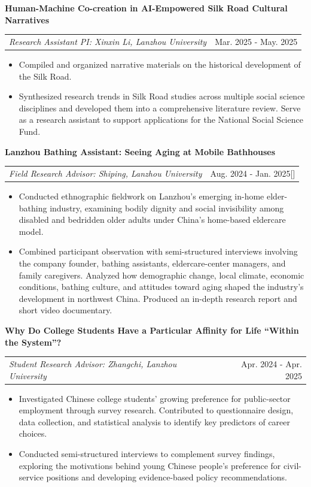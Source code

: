 \documentclass[a4paper,11pt]{article}
\makeatletter
\renewcommand{\normalsize}{\fontsize{10.5bp}{13.5bp}\selectfont}
\renewcommand{\small}{\normalsize}
\renewcommand{\footnotesize}{\normalsize}
\newcommand{\resumeExperience}[4]{
\item
    \textbf{#1}\\[1.65bp]
    \begin{tabularx}{0.98\textwidth}[t]{@{}X r@{}}
        \small\textit{#3} & \footnotesize #4\hspace{1mm}#2
    \end{tabularx}
    \vspace{-1mm}
}
\newcommand{\resumeItemListStart}{\begin{itemize}[leftmargin=3.6mm,labelsep=1mm,topsep=0pt,partopsep=0pt,before=\vspace{4.65bp},itemsep=0.5mm]\justifying}
\newcommand{\resumeItemListEnd}{\end{itemize}}
\makeatother
\begin{document}
\resumeExperience
  {Human-Machine Co-creation in AI-Empowered Silk Road Cultural Narratives}
  {}
  {Research Assistant \textbar{} PI: Xinxin Li, Lanzhou University}{Mar. 2025 - May. 2025}
\resumeItemListStart
\item Compiled and organized narrative materials on the historical development of the Silk Road.
\item Synthesized research trends in Silk Road studies across multiple social science disciplines and developed them into a comprehensive literature review. Serve as a research assistant to support applications for the National Social Science Fund.
\resumeItemListEnd

\resumeExperience
  {Lanzhou Bathing Assistant: Seeing Aging at Mobile Bathhouses}{{}[\href{https://mp.weixin.qq.com/s/s2g08dymkUmCNVC3X7gi9g}{\textcolor{darkblue}{\faGlobe}}]}
  {Field Research \textbar{} Advisor: Shiping, Lanzhou University}{Aug. 2024 - Jan. 2025}
\resumeItemListStart
  \item Conducted ethnographic fieldwork on Lanzhou's emerging in-home elder-bathing industry, examining bodily dignity and social invisibility among disabled and bedridden older adults under China's home-based eldercare model.
  \item Combined participant observation with semi-structured interviews involving the company founder, bathing assistants, eldercare-center managers, and family caregivers. Analyzed how demographic change, local climate, economic conditions, bathing culture, and attitudes toward aging shaped the industry’s development in northwest China. Produced an in-depth research report and short video documentary.
\resumeItemListEnd

\resumeExperience
  {Why Do College Students Have a Particular Affinity for Life ``Within the System''?}
  {}
  {Student Research \textbar{} Advisor: Zhangchi, Lanzhou University}{Apr. 2024 - Apr. 2025}
\resumeItemListStart
  \item Investigated Chinese college students' growing preference for public-sector employment through survey research. Contributed to questionnaire design, data collection, and statistical analysis to identify key predictors of career choices.
  \item Conducted semi-structured interviews to complement survey findings, exploring the motivations behind young Chinese people's preference for civil-service positions and developing evidence-based policy recommendations.
\resumeItemListEnd
\end{document}

